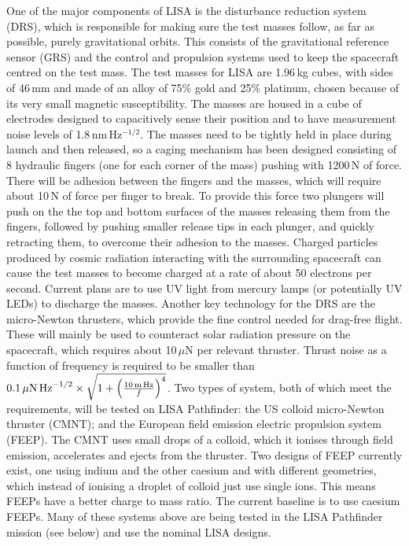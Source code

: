 \documentclass{article}
\begin{document}
One of the major components of LISA is the disturbance reduction system (DRS),
which is responsible for making sure the test masses follow, as far as
possible, purely gravitational orbits. This consists of the gravitational
reference sensor (GRS) and the control and propulsion systems used to keep the
spacecraft centred on the test mass. The test masses for LISA are 1.96\,kg
cubes, with sides of 46\,mm and made of an alloy of 75\% gold and 25\% platinum,
chosen because of its very small magnetic susceptibility. The masses are housed
in a cube of electrodes designed to capacitively sense their position and
to have measurement noise levels of 1.8\,nm\,Hz$^{-1/2}$. The masses need to be
tightly held in place during launch and then released, so a caging mechanism
has been designed consisting of 8 hydraulic fingers (one for each corner of the
mass) pushing with 1200\,N of force. There will be adhesion between the fingers
and the masses, which will require about 10\,N of force per finger to break. To
provide this force two plungers will push on the the top and bottom surfaces of
the masses releasing them from the fingers, followed by pushing smaller release
tips in each plunger, and quickly retracting them, to overcome their adhesion to
the masses. Charged particles produced by cosmic radiation interacting with the
surrounding spacecraft can cause the test masses to become charged at a rate of
about 50 electrons per second. Current plans are to use UV light from mercury
lamps (or potentially UV LEDs) to discharge the masses. Another key technology
for the DRS are the micro-Newton thrusters, which provide the fine control
needed for drag-free flight. These will mainly be used to counteract solar
radiation pressure on the spacecraft, which requires about 10\,$\mu$N per
relevant thruster. Thrust noise as a function of frequency is required to be
smaller than $0.1\,\mu{\rm N}\,{\rm
Hz}^{-1/2}\times\sqrt{1+\left(\frac{10\,{\rm m}\,{\rm Hz}}{f}\right)^4}$. Two
types of system, both of which meet the requirements, will be tested on LISA
Pathfinder: the US colloid micro-Newton thruster (CMNT); and the European field
emission electric propulsion system (FEEP). The CMNT uses small drops of a
colloid, which it ionises through field emission, accelerates and ejects from
the thruster. Two designs of FEEP currently exist, one using indium and the
other caesium and with different geometries, which instead of ionising a droplet
of colloid just use single ions. This means FEEPs have a better charge to mass
ratio. The current baseline is to use caesium FEEPs. Many of these systems above
are being tested in the LISA Pathfinder mission (see below) and use the nominal
LISA designs.
\end{document}

